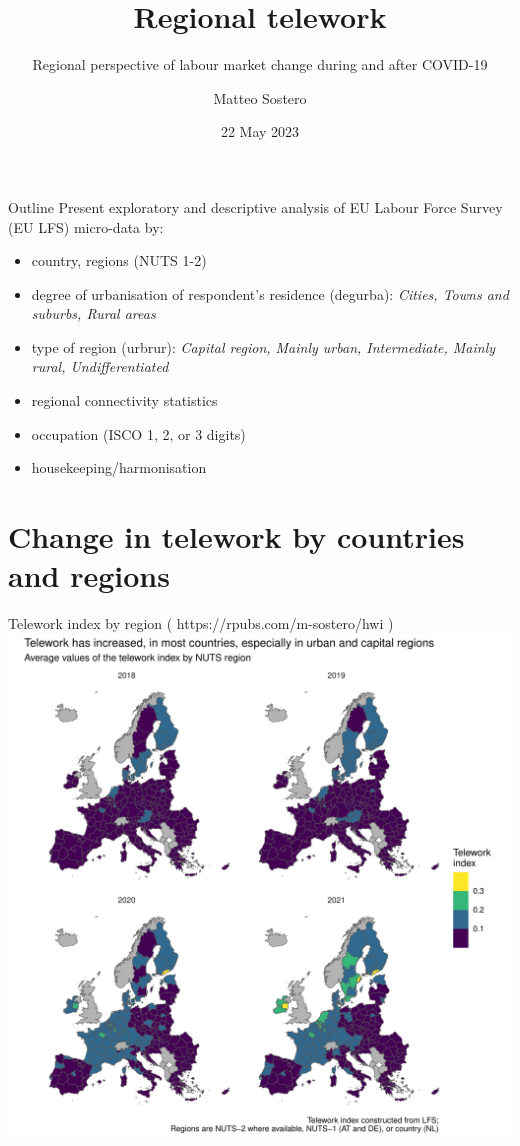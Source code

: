\documentclass[10pt]{beamer}
\title{Regional telework}
\subtitle{\small Regional perspective of labour market change during and after COVID-19}
\date{22 May 2023}
\author{Matteo Sostero}
\begin{document}
\maketitle

\begin{frame}{Outline}
Present exploratory and descriptive analysis of EU Labour Force Survey (EU LFS) micro-data by:
\begin{itemize}
  \item country, regions (NUTS 1-2)
  \item degree of urbanisation of respondent's residence (degurba): \emph{Cities, Towns and suburbs, Rural areas}
  \item type of region (urbrur): \emph{Capital region, Mainly urban, Intermediate, Mainly rural, Undifferentiated}
  \item regional connectivity statistics
  \item occupation (ISCO 1, 2, or 3 digits)
  \item housekeeping/harmonisation
\end{itemize}
\end{frame}

\section{Change in telework by countries and regions}

\begin{frame}{Telework index by region ( https://rpubs.com/m-sostero/hwi )}
\centering
\includegraphics[width=\textwidth,height=0.9\textheight,keepaspectratio]{Telework_nuts_years.pdf}
\end{frame}
\end{document}
